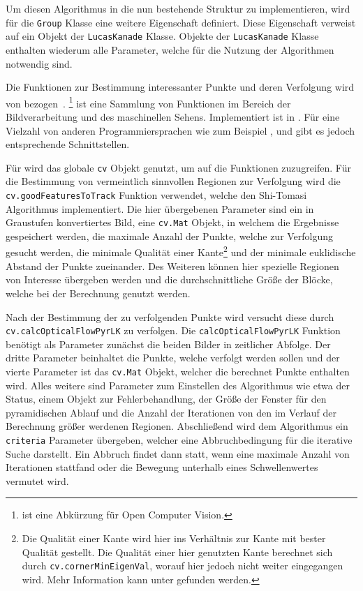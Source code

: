 Um diesen Algorithmus in die nun bestehende Struktur zu implementieren, wird für die \lstinline{Group} Klasse eine weitere Eigenschaft definiert.
Diese Eigenschaft verweist auf ein Objekt der \lstinline{LucasKanade} Klasse.
Objekte der \lstinline{LucasKanade} Klasse enthalten wiederum alle Parameter, welche für die Nutzung der Algorithmen notwendig sind.

Die Funktionen zur Bestimmung interessanter Punkte und deren Verfolgung wird von  bezogen~\cite{OpenCV2021}.
\footnote{ ist eine Abkürzung für Open Computer Vision.} ist eine Sammlung von Funktionen im Bereich der Bildverarbeitung und des maschinellen Sehens.
Implementiert ist  in .
Für eine Vielzahl von anderen Programmiersprachen wie zum Beispiel ,  und  gibt es jedoch entsprechende Schnittstellen.

Für  wird das globale \lstinline{cv} Objekt genutzt, um auf die Funktionen zuzugreifen.
Für die Bestimmung von vermeintlich sinnvollen Regionen zur Verfolgung wird die \lstinline{cv.goodFeaturesToTrack} Funktion verwendet, welche den Shi-Tomasi Algorithmus implementiert.
Die hier übergebenen Parameter sind ein in Graustufen konvertiertes Bild, eine \lstinline{cv.Mat} Objekt, in welchem die Ergebnisse gespeichert werden, die maximale Anzahl der Punkte, welche zur Verfolgung gesucht werden, die minimale Qualität einer Kante\footnote{Die Qualität einer Kante wird hier ins Verhältnis zur Kante mit bester Qualität gestellt.
Die Qualität einer hier genutzten Kante berechnet sich durch \lstinline{cv.cornerMinEigenVal}, worauf hier jedoch nicht weiter eingegangen wird.
Mehr Information kann unter  gefunden werden.} und der minimale euklidische Abstand der Punkte zueinander.
Des Weiteren können hier spezielle Regionen von Interesse übergeben werden und die durchschnittliche Grö{\ss}e der Blöcke, welche bei der Berechnung genutzt werden.

Nach der Bestimmung der zu verfolgenden Punkte wird versucht diese durch \lstinline{cv.calcOpticalFlowPyrLK} zu verfolgen.
Die \lstinline{calcOpticalFlowPyrLK} Funktion benötigt als Parameter zunächst die beiden Bilder in zeitlicher Abfolge.
Der dritte Parameter beinhaltet die Punkte, welche verfolgt werden sollen und der vierte Parameter ist das \lstinline{cv.Mat} Objekt, welcher die berechnet Punkte enthalten wird.
Alles weitere sind Parameter zum Einstellen des Algorithmus wie etwa der Status, einem Objekt zur Fehlerbehandlung, der Grö{\ss}e der Fenster für den pyramidischen Ablauf und die Anzahl der Iterationen von den im Verlauf der Berechnung grö{\ss}er werdenen Regionen.
Abschlie{\ss}end wird dem Algorithmus ein \lstinline{criteria} Parameter übergeben, welcher eine Abbruchbedingung für die iterative Suche darstellt.
Ein Abbruch findet dann statt, wenn eine maximale Anzahl von Iterationen stattfand oder die Bewegung unterhalb eines Schwellenwertes vermutet wird.

